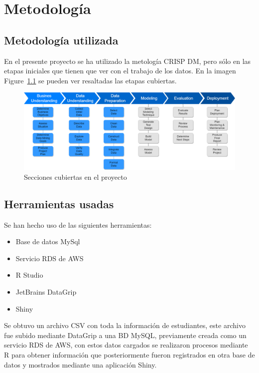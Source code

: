 \chapter{Metodología} %
\label{Chapter2} %

\section{Metodología utilizada}

En el presente proyecto se ha utilizado la metología CRISP DM, pero sólo en las etapas iniciales que tienen que ver con el trabajo de los datos. En la imagen Figure~\ref{fig:crispdm} se pueden ver resaltadas las etapas cubiertas.

\begin{figure}[th]
\centering
\includegraphics[width=1.2\textwidth]{Figures/modelo_crisp}
\decoRule
\caption[Metodolofía Crisp DM]{Secciones cubiertas en el proyecto}
\label{fig:crispdm}
\end{figure}

\section{Herramientas usadas}

Se han hecho uso de las siguientes herramientas:

\begin{itemize}
\item Base de datos MySql
\item Servicio RDS de AWS
\item R Studio
\item JetBrains DataGrip
\item Shiny
\end{itemize}

Se obtuvo un archivo CSV con toda la información de estudiantes, este archivo fue subido mediante DataGrip a una BD MySQL, previamente creada como un servicio RDS de AWS, con estos datos cargados se realizaron procesos mediante R para obtener información que posteriormente fueron registrados en otra base de datos y mostrados mediante una aplicación Shiny.

